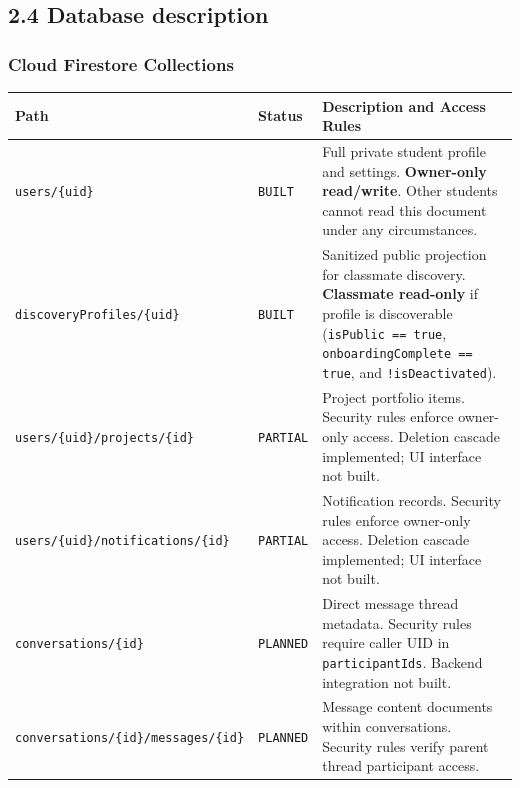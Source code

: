 \documentclass[11pt,letterpaper]{article}
\begin{document}
\subsection*{2.4 Database description}

\subsubsection*{Cloud Firestore Collections}

\begin{table}[h!]
\centering
\small
\begin{tabularx}{\textwidth}{p{3.2cm} p{2.2cm} Y}
\toprule
\textbf{Path} & \textbf{Status} & \textbf{Description and Access Rules} \\
\midrule
\texttt{users/\{uid\}} & \texttt{BUILT} & Full private student profile and settings. \textbf{Owner-only read/write}. Other students cannot read this document under any circumstances. \\
\texttt{discoveryProfiles/}\allowbreak\texttt{\{uid\}} & \texttt{BUILT} & Sanitized public projection for classmate discovery. \textbf{Classmate read-only} if profile is discoverable (\texttt{isPublic == true}, \texttt{onboardingComplete == true}, and \texttt{!isDeactivated}). \\
\texttt{users/\{uid\}/projects/\{id\}} & \texttt{PARTIAL} & Project portfolio items. Security rules enforce owner-only access. Deletion cascade implemented; UI interface not built. \\
\texttt{users/\{uid\}/notifications/\{id\}} & \texttt{PARTIAL} & Notification records. Security rules enforce owner-only access. Deletion cascade implemented; UI interface not built. \\
\texttt{conversations/\{id\}} & \texttt{PLANNED} & Direct message thread metadata. Security rules require caller UID in \texttt{participantIds}. Backend integration not built. \\
\texttt{conversations/\{id\}/messages/\{id\}} & \texttt{PLANNED} & Message content documents within conversations. Security rules verify parent thread participant access. \\
\bottomrule
\end{tabularx}
\end{table}
\end{document}
